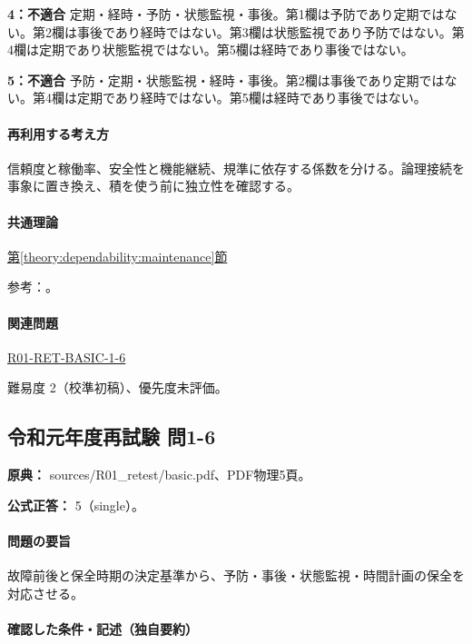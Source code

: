 \noindent\textbf{4：不適合} 定期・経時・予防・状態監視・事後。第1欄は予防であり定期ではない。第2欄は事後であり経時ではない。第3欄は状態監視であり予防ではない。第4欄は定期であり状態監視ではない。第5欄は経時であり事後ではない。\par

\noindent\textbf{5：不適合} 予防・定期・状態監視・経時・事後。第2欄は事後であり定期ではない。第4欄は定期であり経時ではない。第5欄は経時であり事後ではない。\par

\paragraph{再利用する考え方} 信頼度と稼働率、安全性と機能継続、規準に依存する係数を分ける。論理接続を事象に置き換え、積を使う前に独立性を確認する。

\paragraph{共通理論} \hyperref[theory:dependability:maintenance]{第\ref*{theory:dependability:maintenance}節}

\par 参考：\cite{maintenance_mlit_2013}。

\paragraph{関連問題} \hyperref[q:r01-ret-basic-1-6]{R01-RET-BASIC-1-6}

\par 難易度 2（校準初稿）、優先度未評価。

\subsection{令和元年度再試験 問1-6}
\label{q:r01-ret-basic-1-6}

\noindent\textbf{原典：} sources/R01\_retest/basic.pdf、PDF物理5頁。

\textbf{公式正答：} 5（single）。

\paragraph{問題の要旨} 故障前後と保全時期の決定基準から、予防・事後・状態監視・時間計画の保全を対応させる。

\paragraph{確認した条件・記述（独自要約）}\mbox{}\par

